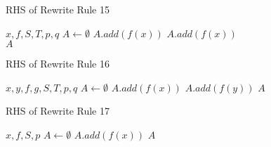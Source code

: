 \documentclass{article}
\begin{document}
\begin{algorithm}
  \caption{RHS of Rewrite Rule 15}
  \begin{algorithmic}
    \Require $x,f,S,T,p,q$
    \State $A \gets \emptyset$
        \State $A.add(f(x))$
      \EndIf
    \EndFor
        \State $A.add(f(x))$
      \EndIf
    \EndFor\\
  \Return $A$
  \end{algorithmic}
  \label{fig:eq15alg}
\end{algorithm}

\begin{algorithm}
  \caption{RHS of Rewrite Rule 16}
  \begin{algorithmic}
    \Require $x,y,f,g,S,T,p,q$
    \State $A \gets \emptyset$
        \State $A.add(f(x))$
      \EndIf
    \EndFor
        \State $A.add(f(y))$
      \EndIf
    \EndFor
  \Return $A$
  \end{algorithmic}
  \label{fig:eq16alg}
\end{algorithm}

\begin{algorithm}
  \caption{RHS of Rewrite Rule 17}
  \begin{algorithmic}
    \Require $x,f,S,p$
    \State $A \gets \emptyset$
        \State $A.add(f(x))$
      \EndIf
    \EndFor
  \Return $A$
  \end{algorithmic}
  \label{fig:eq17alg}
\end{algorithm}







\end{document}
